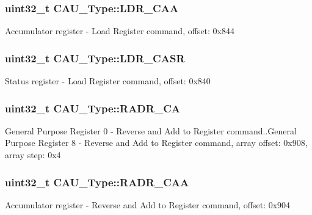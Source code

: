 \subsubsection[{\texorpdfstring{L\+D\+R\+\_\+\+C\+AA}{LDR_CAA}}]{ uint32\+\_\+t C\+A\+U\+\_\+\+Type\+::\+L\+D\+R\+\_\+\+C\+AA}\hypertarget{structCAU__Type_a4ed721a08f4487b46525e8014880e48a}{}\label{structCAU__Type_a4ed721a08f4487b46525e8014880e48a}
Accumulator register -\/ Load Register command, offset\+: 0x844 
\subsubsection[{\texorpdfstring{L\+D\+R\+\_\+\+C\+A\+SR}{LDR_CASR}}]{ uint32\+\_\+t C\+A\+U\+\_\+\+Type\+::\+L\+D\+R\+\_\+\+C\+A\+SR}\hypertarget{structCAU__Type_ad80730fc61ca2c55b4f30b0b96f8f497}{}\label{structCAU__Type_ad80730fc61ca2c55b4f30b0b96f8f497}
Status register -\/ Load Register command, offset\+: 0x840 
\subsubsection[{\texorpdfstring{R\+A\+D\+R\+\_\+\+CA}{RADR_CA}}]{ uint32\+\_\+t C\+A\+U\+\_\+\+Type\+::\+R\+A\+D\+R\+\_\+\+CA}\hypertarget{structCAU__Type_a8318aadbfeebbcfcf8e4307edf3d568a}{}\label{structCAU__Type_a8318aadbfeebbcfcf8e4307edf3d568a}
General Purpose Register 0 -\/ Reverse and Add to Register command..General Purpose Register 8 -\/ Reverse and Add to Register command, array offset\+: 0x908, array step\+: 0x4 
\subsubsection[{\texorpdfstring{R\+A\+D\+R\+\_\+\+C\+AA}{RADR_CAA}}]{ uint32\+\_\+t C\+A\+U\+\_\+\+Type\+::\+R\+A\+D\+R\+\_\+\+C\+AA}\hypertarget{structCAU__Type_a540d27a6ffbecc85ba1c68dd023ce27f}{}\label{structCAU__Type_a540d27a6ffbecc85ba1c68dd023ce27f}
Accumulator register -\/ Reverse and Add to Register command, offset\+: 0x904 
